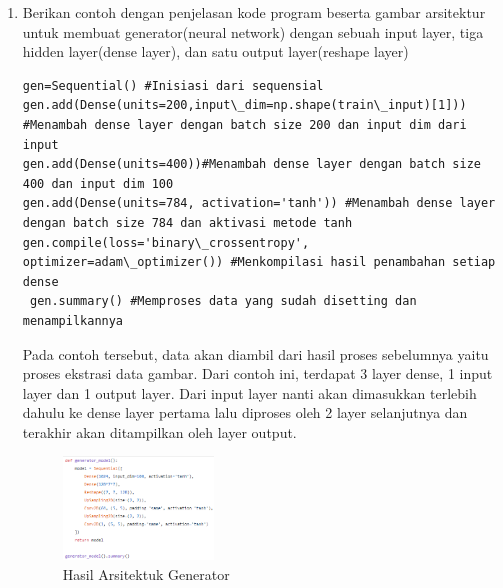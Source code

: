 \begin{enumerate}
            \item Berikan contoh dengan penjelasan kode program beserta gambar arsitektur untuk membuat generator(neural network) dengan sebuah input layer, tiga hidden layer(dense layer), dan satu output layer(reshape layer)
\begin{verbatim}
gen=Sequential() #Inisiasi dari sequensial
gen.add(Dense(units=200,input\_dim=np.shape(train\_input)[1])) #Menambah dense layer dengan batch size 200 dan input dim dari input
gen.add(Dense(units=400))#Menambah dense layer dengan batch size 400 dan input dim 100
gen.add(Dense(units=784, activation='tanh')) #Menambah dense layer dengan batch size 784 dan aktivasi metode tanh
gen.compile(loss='binary\_crossentropy', optimizer=adam\_optimizer()) #Menkompilasi hasil penambahan setiap dense
 gen.summary() #Memproses data yang sudah disetting dan menampilkannya
\end{verbatim}    
            \par Pada contoh tersebut, data akan diambil dari hasil proses sebelumnya yaitu proses ekstrasi data gambar. Dari contoh ini, terdapat 3 layer dense, 1 input layer dan 1 output layer. Dari input layer nanti akan dimasukkan terlebih dahulu ke dense layer pertama lalu diproses oleh 2 layer selanjutnya dan terakhir akan ditampilkan oleh layer output.
            \begin{figure}[H]
                \includegraphics[width=4cm]{figures/1174039/chapter8/teori9.PNG}
                \centering
                  \caption{Hasil Arsitektuk Generator}
            \end{figure}


\end{enumerate}
